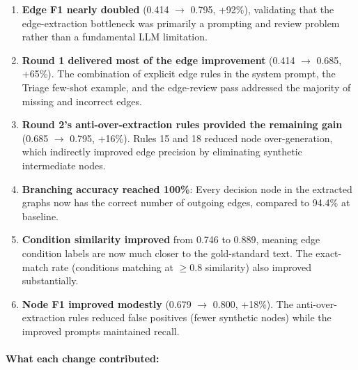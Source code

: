 \documentclass[12pt,a4paper]{article}
\begin{document}
\begin{enumerate}[leftmargin=2em]
    \item \textbf{Edge F1 nearly doubled} (0.414 $\rightarrow$ 0.795, +92\%), validating that the edge-extraction bottleneck was primarily a prompting and review problem rather than a fundamental LLM limitation.

    \item \textbf{Round 1 delivered most of the edge improvement} (0.414 $\rightarrow$ 0.685, +65\%). The combination of explicit edge rules in the system prompt, the Triage few-shot example, and the edge-review pass addressed the majority of missing and incorrect edges.

    \item \textbf{Round 2's anti-over-extraction rules provided the remaining gain} (0.685 $\rightarrow$ 0.795, +16\%). Rules 15 and 18 reduced node over-generation, which indirectly improved edge precision by eliminating synthetic intermediate nodes.

    \item \textbf{Branching accuracy reached 100\%}: Every decision node in the extracted graphs now has the correct number of outgoing edges, compared to 94.4\% at baseline.

    \item \textbf{Condition similarity improved} from 0.746 to 0.889, meaning edge condition labels are now much closer to the gold-standard text. The exact-match rate (conditions matching at $\geq$0.8 similarity) also improved substantially.

    \item \textbf{Node F1 improved modestly} (0.679 $\rightarrow$ 0.800, +18\%). The anti-over-extraction rules reduced false positives (fewer synthetic nodes) while the improved prompts maintained recall.
\end{enumerate}

\paragraph{What each change contributed:}
\end{document}
